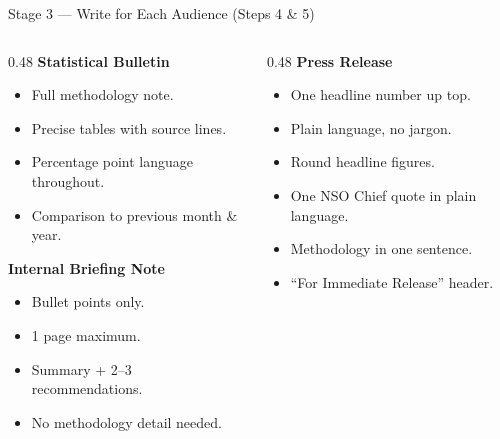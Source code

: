 \documentclass[xcolor={table,dvipsnames},aspectratio=169,11pt]{beamer}
\begin{document}
\begin{frame}{Stage 3 --- Write for Each Audience (Steps 4 \& 5)}
    \begin{columns}[t]
        \begin{column}{0.48\textwidth}
            \small
            \textbf{Statistical Bulletin}
            \begin{itemize}
                \item Full methodology note.
                \item Precise tables with source lines.
                \item Percentage point language throughout.
                \item Comparison to previous month \& year.
            \end{itemize}
            \vskip 0.2cm
            \textbf{Internal Briefing Note}
            \begin{itemize}
                \item Bullet points only.
                \item 1 page maximum.
                \item Summary + 2--3 recommendations.
                \item No methodology detail needed.
            \end{itemize}
        \end{column}
        \begin{column}{0.48\textwidth}
            \small
            \textbf{Press Release}
            \begin{itemize}
                \item One headline number up top.
                \item Plain language, no jargon.
                \item Round headline figures.
                \item One NSO Chief quote in plain language.
                \item Methodology in one sentence.
                \item ``For Immediate Release'' header.
            \end{itemize}
        \end{column}
    \end{columns}
\end{frame}
\end{document}
